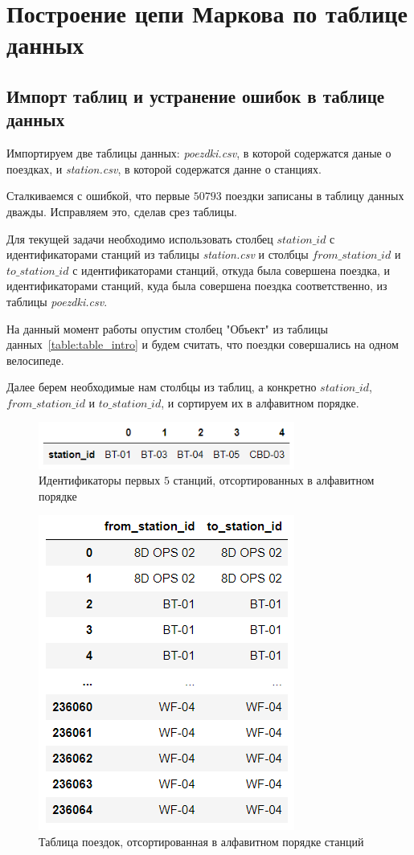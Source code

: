 \documentclass[specialist, substylefile = spbu_report.rtx, subf,href,colorlinks=true, 12pt]{disser}
\begin{document}
\chapter{Построение цепи Маркова по таблице данных}
\section{Импорт таблиц и устранение ошибок в таблице данных}

Импортируем две таблицы данных: \textit{poezdki.csv}, в которой содержатся даные о поездках, и \textit{station.csv}, в которой содержатся данне о станциях.

Сталкиваемся с ошибкой, что первые $50793$ поездки записаны в таблицу данных дважды. Исправляем это, сделав срез таблицы.

Для текущей задачи необходимо использовать столбец $station\_id$ с идентификаторами станций из таблицы \textit{station.csv} и столбцы $from\_station\_id$ и $to\_station\_id$ с идентификаторами станций, откуда была совершена поездка, и идентификаторами станций, куда была совершена поездка соответственно, из таблицы \textit{poezdki.csv}.

На данный момент работы опустим столбец "Объект" из таблицы данных~\eqref{table:table_intro} и будем считать, что поездки совершались на одном велосипеде.

Далее берем необходимые нам столбцы из таблиц, а конкретно $station\_id$, \\ $from\_station\_id$ и $to\_station\_id$, и сортируем их в алфавитном порядке.

\begin{figure}[h]
	\centering
	\includegraphics[width = 0.75\textwidth]{1.png}
	\caption{Идентификаторы первых $5$ станций, отсортированных в алфавитном порядке}\label{fig:fig1}
\end{figure}

\begin{figure}[h]
	\centering
	\includegraphics[height = 0.5\textwidth]{2.png}
	\caption{Таблица поездок, отсортированная в алфавитном порядке станций}\label{fig:fig2}
\end{figure}
\end{document}
